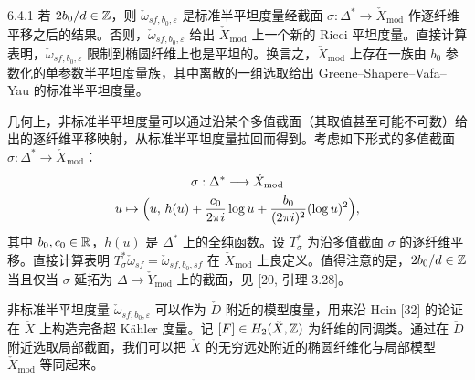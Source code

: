 \begin{remark}{6.4.1}
若 $2b_0/d\in\mathbb{Z}$，则 $\check\omega_{sf,b_0,\varepsilon}$ 是标准半平坦度量经截面 $\sigma:\Delta^*\to\check X_{\mathrm{mod}}$ 作逐纤维平移之后的结果。否则，$\check\omega_{sf,b_0,\varepsilon}$ 给出 $\check X_{\mathrm{mod}}$ 上一个新的 Ricci 平坦度量。直接计算表明，$\check\omega_{sf,b_0,\varepsilon}$ 限制到椭圆纤维上也是平坦的。换言之，$\check X_{\mathrm{mod}}$ 上存在一族由 $b_0$ 参数化的单参数半平坦度量族，其中离散的一组选取给出 Greene--Shapere--Vafa--Yau 的标准半平坦度量。
\end{remark}

几何上，非标准半平坦度量可以通过沿某个多值截面（其取值甚至可能不可数）给出的逐纤维平移映射，从标准半平坦度量拉回而得到。考虑如下形式的多值截面 $\sigma:\Delta^*\to\check X_{\mathrm{mod}}$：
\[
\begin{gathered}
\sigma:\Delta^*\longrightarrow\check X_{\mathrm{mod}}\\
u\mapsto\Bigl(u,\,h(u)+\frac{c_0}{2\pi i}\log u+\frac{b_0}{(2\pi i)^2}(\log u)^2\Bigr),
\end{gathered}
\]
其中 $b_0,c_0\in\mathbb{R}$，$h(u)$ 是 $\Delta^*$ 上的全纯函数。设 $T_\sigma^*$ 为沿多值截面 $\sigma$ 的逐纤维平移。直接计算表明 $T_\sigma^*\check\omega_{sf}=\check\omega_{sf,b_0,sf}$ 在 $\check X_{\mathrm{mod}}$ 上良定义。值得注意的是，$2b_0/d\in\mathbb{Z}$ 当且仅当 $\sigma$ 延拓为 $\Delta\to\check Y_{\mathrm{mod}}$ 上的截面，见 [20, 引理 3.28]。

非标准半平坦度量 $\check\omega_{sf,b_0,\varepsilon}$ 可以作为 $\check D$ 附近的模型度量，用来沿 Hein [32] 的论证在 $\check X$ 上构造完备超 Kähler 度量。记 $[F]\in H_2(\check X,\mathbb{Z})$ 为纤维的同调类。通过在 $\check D$ 附近选取局部截面，我们可以把 $\check X$ 的无穷远处附近的椭圆纤维化与局部模型 $\check X_{\mathrm{mod}}$ 等同起来。

